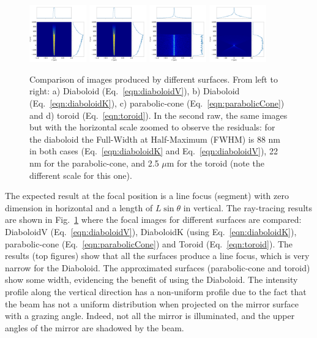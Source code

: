 \documentclass{iucr}              %
\begin{document}
\begin{figure}[h]
\includegraphics[width=0.22\textwidth]{figures/p2s_V_z.png}
\includegraphics[width=0.22\textwidth]{figures/p2s_K_z.png}
\includegraphics[width=0.22\textwidth]{figures/p2s_parabolic-cone_z.png}
\includegraphics[width=0.22\textwidth]{figures/p2s_toroid_z.png}
\caption{\label{fig:pointToSegment}Comparison of images produced by different surfaces. From left to right: a) Diaboloid (Eq.~\ref{eqn:diaboloidV}), b) Diaboloid (Eq.~\ref{eqn:diaboloidK}), c) parabolic-cone (Eq.~\ref{eqn:parabolicCone}) and d) toroid (Eq.~\ref{eqn:toroid}). In the second raw, the same images but with the horizontal scale zoomed to observe the residuals: for the diaboloid the Full-Width at Half-Maximum (FWHM) is 88 nm in both cases (Eq.~\ref{eqn:diaboloidK} and Eq.~\ref{eqn:diaboloidV}), 22 nm for the parabolic-cone, and 2.5 $\mu$m for the toroid (note the different scale for this one).
}
\end{figure}

The expected result at the focal position is a line focus (segment) with zero dimension in horizontal and a length of $L\sin\theta$ in vertical. The ray-tracing results are shown in Fig.~\ref{fig:pointToSegment} where the focal images for different surfaces are compared: DiaboloidV (Eq.~\ref{eqn:diaboloidV}), DiaboloidK (using Eq.~\ref{eqn:diaboloidK}), parabolic-cone (Eq.~\ref{eqn:parabolicCone}) and Toroid (Eq.~\ref{eqn:toroid}). The results (top figures) show that all the surfaces produce a line focus, which is very narrow for the Diaboloid. The approximated surfaces (parabolic-cone and toroid) show some width, evidencing the benefit of using the Diaboloid. The intensity profile along the vertical direction has a non-uniform profile due to the fact that the beam has not a uniform distribution when projected on the mirror surface with a grazing angle. Indeed, not all the mirror is illuminated, and the upper angles of the mirror are shadowed by the beam. 
\end{document}
